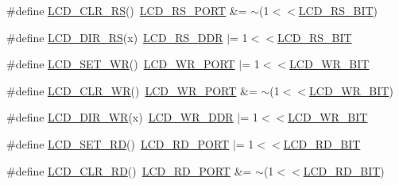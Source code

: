 \begin{DoxyCompactItemize}
\item 
\#define \hyperlink{group___s_s_d1289_ga589fa86e1a7b7f9192da18fd65e87ea2}{L\+C\+D\+\_\+\+C\+L\+R\+\_\+\+R\+S}()~\hyperlink{group___s_s_d1289_gac5be2a22727fd9ca349e1c9bcbfbcd47}{L\+C\+D\+\_\+\+R\+S\+\_\+\+P\+O\+R\+T}  \&= $\sim$(1$<$$<$\hyperlink{group___s_s_d1289_ga3ee95e3ef0c627f4e703afeb1dac335a}{L\+C\+D\+\_\+\+R\+S\+\_\+\+B\+I\+T})
\item 
\#define \hyperlink{group___s_s_d1289_ga9d5cbc2394db106c223847d8b2b7c502}{L\+C\+D\+\_\+\+D\+I\+R\+\_\+\+R\+S}(x)~\hyperlink{group___s_s_d1289_ga1de29b032973d1a75c57a814b064b0d9}{L\+C\+D\+\_\+\+R\+S\+\_\+\+D\+D\+R}   $\vert$=   1$<$$<$\hyperlink{group___s_s_d1289_ga3ee95e3ef0c627f4e703afeb1dac335a}{L\+C\+D\+\_\+\+R\+S\+\_\+\+B\+I\+T}
\item 
\#define \hyperlink{group___s_s_d1289_ga3abf052916601c05b3ea4f2991f7c874}{L\+C\+D\+\_\+\+S\+E\+T\+\_\+\+W\+R}()~\hyperlink{group___s_s_d1289_ga815c38dc74dd91415221223106b0c75b}{L\+C\+D\+\_\+\+W\+R\+\_\+\+P\+O\+R\+T}  $\vert$=   1$<$$<$\hyperlink{group___s_s_d1289_ga9b4501fa334eb3368916fdf8ad26aec1}{L\+C\+D\+\_\+\+W\+R\+\_\+\+B\+I\+T}
\item 
\#define \hyperlink{group___s_s_d1289_gad1f988571b27c98f768697ad47c4993f}{L\+C\+D\+\_\+\+C\+L\+R\+\_\+\+W\+R}()~\hyperlink{group___s_s_d1289_ga815c38dc74dd91415221223106b0c75b}{L\+C\+D\+\_\+\+W\+R\+\_\+\+P\+O\+R\+T}  \&= $\sim$(1$<$$<$\hyperlink{group___s_s_d1289_ga9b4501fa334eb3368916fdf8ad26aec1}{L\+C\+D\+\_\+\+W\+R\+\_\+\+B\+I\+T})
\item 
\#define \hyperlink{group___s_s_d1289_gafb9cc344a1c6dcb340e4b5cb14ebccba}{L\+C\+D\+\_\+\+D\+I\+R\+\_\+\+W\+R}(x)~\hyperlink{group___s_s_d1289_ga218b58fc651c7a4baa3fc4b8616f32fb}{L\+C\+D\+\_\+\+W\+R\+\_\+\+D\+D\+R}   $\vert$=   1$<$$<$\hyperlink{group___s_s_d1289_ga9b4501fa334eb3368916fdf8ad26aec1}{L\+C\+D\+\_\+\+W\+R\+\_\+\+B\+I\+T}
\item 
\#define \hyperlink{group___s_s_d1289_ga69562f19ee2afb55c52b1cc0cb61d39e}{L\+C\+D\+\_\+\+S\+E\+T\+\_\+\+R\+D}()~\hyperlink{group___s_s_d1289_ga34dbbb92d6226e04c2b81615709ace33}{L\+C\+D\+\_\+\+R\+D\+\_\+\+P\+O\+R\+T}  $\vert$=   1$<$$<$\hyperlink{group___s_s_d1289_gabeb8982482e0266522a002535b45b216}{L\+C\+D\+\_\+\+R\+D\+\_\+\+B\+I\+T}
\item 
\#define \hyperlink{group___s_s_d1289_gaa881e58a85d76205cfe5ca5a7576f5a6}{L\+C\+D\+\_\+\+C\+L\+R\+\_\+\+R\+D}()~\hyperlink{group___s_s_d1289_ga34dbbb92d6226e04c2b81615709ace33}{L\+C\+D\+\_\+\+R\+D\+\_\+\+P\+O\+R\+T}  \&= $\sim$(1$<$$<$\hyperlink{group___s_s_d1289_gabeb8982482e0266522a002535b45b216}{L\+C\+D\+\_\+\+R\+D\+\_\+\+B\+I\+T})
$$
\end{DoxyCompactItemize}
